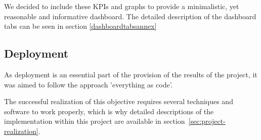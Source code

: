 We decided to include these KPIs and graphs to provide a minimalistic, yet reasonable and informative dashboard.
The detailed description of the dashboard tabs can be seen in section \ref{dashboardtabsannex}



\subsection{Deployment}\label{subsec:deployment}
As deployment is an essential part of the provision of the results of the project, it was aimed to follow the approach 'everything as code'.

The successful realization of this objective requires several techniques and software to work properly, which is why detailed descriptions of the implementation within this project are available in section~\ref{sec:project-realization}.
